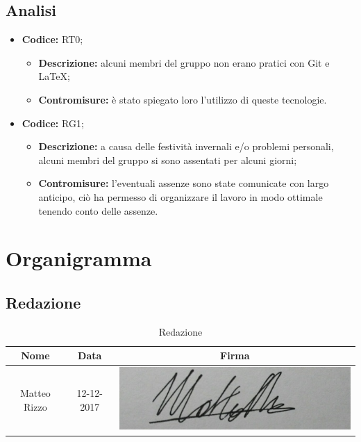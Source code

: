 \documentclass[./PianodiProgetto.tex]{subfiles}
\begin{document}
\section{Analisi}

\begin{itemize}
	\item \textbf{Codice:} RT0;
	\begin{itemize}
		\item \textbf{Descrizione:} alcuni membri del gruppo non erano pratici con Git e \LaTeX;
		\item \textbf{Contromisure:} è stato spiegato loro l'utilizzo di queste tecnologie.
	\end{itemize} 
	\item \textbf{Codice:} RG1;
	\begin{itemize}
		\item \textbf{Descrizione:} a causa delle festività invernali e/o problemi personali, alcuni membri del gruppo si sono assentati per alcuni giorni;
		\item \textbf{Contromisure:} l'eventuali assenze sono state comunicate con largo anticipo, ciò ha permesso di organizzare il lavoro in modo ottimale tenendo conto delle assenze.
	\end{itemize} 
\end{itemize}

\chapter{Organigramma}

\section{Redazione}
\begin{table}[H]
	\centering
	\begin{tabular}{|c|c|c|}
		\hline
		Nome&Data&Firma \\ \hline
		Matteo Rizzo& 12-12-2017 &\includegraphics[scale=0.5]{img/firme/RizzoMatteo} \\
		\hline
	\end{tabular}
	\caption{Redazione}
\end{table}
\end{document}
